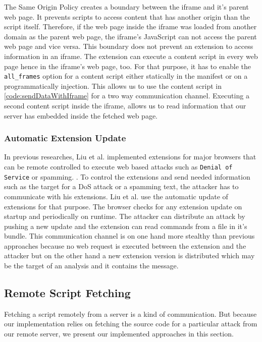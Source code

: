 	The Same Origin Policy creates a boundary between the iframe and it's parent web page. It prevents scripts to access content that has another origin than the script itself. Therefore, if the web page inside the iframe was loaded from another domain as the parent web page, the iframe's JavaScript can not access the parent web page and vice versa. This boundary does not prevent an extension to access information in an iframe. The extension can execute a content script in every web page hence in the iframe's web page, too. For that purpose, it has to enable the \texttt{all\_frames} option for a content script either statically in the manifest or on a programmatically injection. This allows us to use the content script in \autoref{code:sendDataWithIframe} for a two way communication channel. Executing a second content script inside the iframe, allows us to read information that our server has embedded inside the fetched web page. 

\subsubsection{Automatic Extension Update}

	In previous researches, Liu et al. implemented extensions for major browsers that can be remote controlled to execute web based attacks such as \texttt{Denial of Service} or spamming. \cite{liu2011botnet, Liu12chromeextensions:}. To control the extensions and send needed information such as the target for a DoS attack or a spamming text, the attacker has to communicate with his extensions. Liu et al. use the automatic update of extensions for that purpose. The browser checks for any extension update on startup and periodically on runtime. The attacker can distribute an attack by pushing a new update and the extension can read commands from a file in it's bundle. This communication channel is on one hand more stealthy than previous approaches because no web request is executed between the extension and the attacker but on the other hand a new extension version is distributed which may be the target of an analysis and it contains the message. 


\subsection{Remote Script Fetching}
		
	Fetching a script remotely from a server is a kind of communication. But because our implementation relies on fetching the source code for a particular attack from our remote server, we present our implemented approaches in this section.
	
